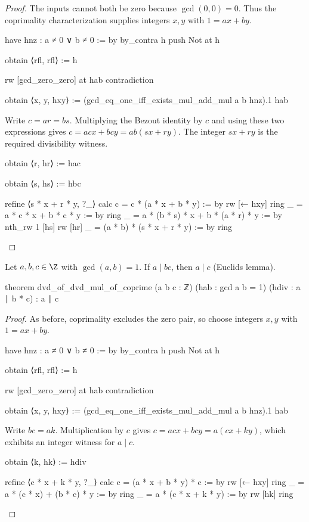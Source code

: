 \begin{proof}
  The inputs cannot both be zero because $\gcd(0,0)=0$. Thus the coprimality characterization supplies integers $x,y$ with $1=ax+by$.

  \begin{lean}
    have hnz : a ≠ 0 ∨ b ≠ 0 := by
      by_contra h
      push Not at h

      obtain ⟨rfl, rfl⟩ := h

      rw [gcd_zero_zero] at hab
      contradiction

    obtain ⟨x, y, hxy⟩ := (gcd_eq_one_iff_exists_mul_add_mul a b hnz).1 hab
  \end{lean}
  Write $c=ar=bs$. Multiplying the Bezout identity by $c$ and using these two expressions gives $c=acx+bcy=ab(sx+ry)$. The integer $sx+ry$ is the required divisibility witness.

  \begin{lean}
    obtain ⟨r, hr⟩ := hac

    obtain ⟨s, hs⟩ := hbc

    refine ⟨s * x + r * y, ?_⟩
    calc
      c = c * (a * x + b * y) := by
        rw [← hxy]
        ring
      _ = a * c * x + b * c * y := by
        ring
      _ = a * (b * s) * x + b * (a * r) * y := by
        nth_rw 1 [hs]
        rw [hr]
      _ = (a * b) * (s * x + r * y) := by
        ring
  \end{lean}
\end{proof}

\begin{theorem} \label{nt:thm:euclid-lemma}
  Let $a,b,c\in\Z$ with $\gcd(a,b)=1$. If $a\mid bc$, then $a\mid c$ (Euclid\textquotesingle s lemma).

  \begin{lean}
    theorem dvd_of_dvd_mul_of_coprime (a b c : ℤ) (hab : gcd a b = 1)
        (hdiv : a ∣ b * c) : a ∣ c
  \end{lean}
\end{theorem}

\begin{proof}
  As before, coprimality excludes the zero pair, so choose integers $x,y$ with $1=ax+by$.

  \begin{lean}
    have hnz : a ≠ 0 ∨ b ≠ 0 := by
      by_contra h
      push Not at h

      obtain ⟨rfl, rfl⟩ := h

      rw [gcd_zero_zero] at hab
      contradiction

    obtain ⟨x, y, hxy⟩ := (gcd_eq_one_iff_exists_mul_add_mul a b hnz).1 hab
  \end{lean}
  Write $bc=ak$. Multiplication by $c$ gives $c=acx+bcy=a(cx+ky)$, which exhibits an integer witness for $a\mid c$.

  \begin{lean}
    obtain ⟨k, hk⟩ := hdiv

    refine ⟨c * x + k * y, ?_⟩
    calc
      c = (a * x + b * y) * c := by
        rw [← hxy]
        ring
      _ = a * (c * x) + (b * c) * y := by
        ring
      _ = a * (c * x + k * y) := by
        rw [hk]
        ring
  \end{lean}
\end{proof}

